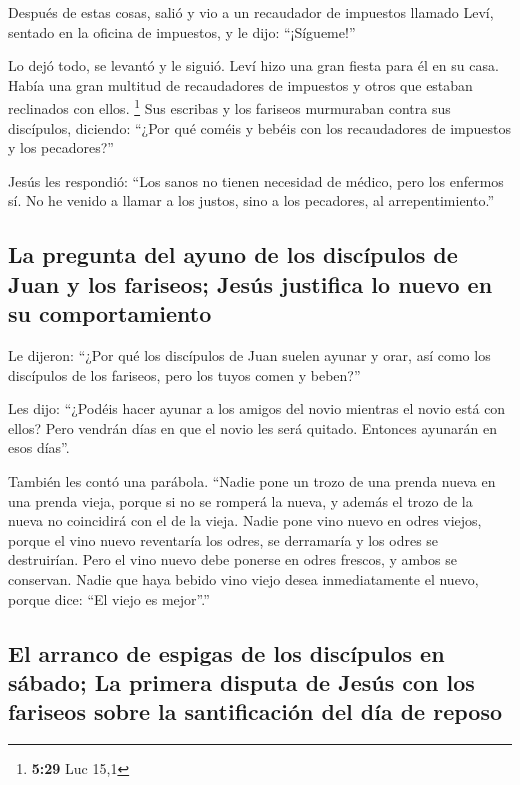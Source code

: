 Después de estas cosas, salió y vio a un recaudador de
impuestos llamado Leví, sentado en la oficina de impuestos, y le dijo:
``¡Sígueme!''

 Lo dejó todo, se levantó y le siguió. 
Leví hizo una gran fiesta para él en su casa. Había una gran multitud de
recaudadores de impuestos y otros que estaban reclinados con ellos.
\footnote{\textbf{5:29} Luc 15,1}  Sus escribas y los
fariseos murmuraban contra sus discípulos, diciendo: ``¿Por qué coméis y
bebéis con los recaudadores de impuestos y los pecadores?''

 Jesús les respondió: ``Los sanos no tienen necesidad de
médico, pero los enfermos sí.  No he venido a llamar a
los justos, sino a los pecadores, al arrepentimiento.''

\hypertarget{la-pregunta-del-ayuno-de-los-discuxedpulos-de-juan-y-los-fariseos-jesuxfas-justifica-lo-nuevo-en-su-comportamiento}{%
\subsection{La pregunta del ayuno de los discípulos de Juan y los
fariseos; Jesús justifica lo nuevo en su
comportamiento}\label{la-pregunta-del-ayuno-de-los-discuxedpulos-de-juan-y-los-fariseos-jesuxfas-justifica-lo-nuevo-en-su-comportamiento}}

 Le dijeron: ``¿Por qué los discípulos de Juan suelen
ayunar y orar, así como los discípulos de los fariseos, pero los tuyos
comen y beben?''

 Les dijo: ``¿Podéis hacer ayunar a los amigos del novio
mientras el novio está con ellos?  Pero vendrán días en
que el novio les será quitado. Entonces ayunarán en esos días''.

 También les contó una parábola. ``Nadie pone un trozo de
una prenda nueva en una prenda vieja, porque si no se romperá la nueva,
y además el trozo de la nueva no coincidirá con el de la vieja.
 Nadie pone vino nuevo en odres viejos, porque el vino
nuevo reventaría los odres, se derramaría y los odres se destruirían.
 Pero el vino nuevo debe ponerse en odres frescos, y
ambos se conservan.  Nadie que haya bebido vino viejo
desea inmediatamente el nuevo, porque dice: ``El viejo es mejor''.''

\hypertarget{el-arranco-de-espigas-de-los-discuxedpulos-en-suxe1bado-la-primera-disputa-de-jesuxfas-con-los-fariseos-sobre-la-santificaciuxf3n-del-duxeda-de-reposo}{%
\subsection{El arranco de espigas de los discípulos en sábado; La
primera disputa de Jesús con los fariseos sobre la santificación del día
de
reposo}\label{el-arranco-de-espigas-de-los-discuxedpulos-en-suxe1bado-la-primera-disputa-de-jesuxfas-con-los-fariseos-sobre-la-santificaciuxf3n-del-duxeda-de-reposo}}

